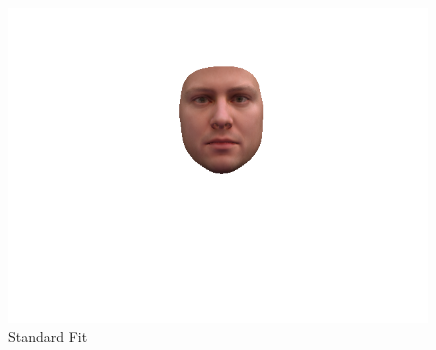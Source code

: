 \begin{figure}[h]
\begin{minipage}{.325\textwidth}
    \end{minipage}
    \begin{minipage}{.325\textwidth}
      \centering
      \caption*{Standard Fit}
      \includegraphics[width=0.99\textwidth]{Figures/dataset/2D/1.png}
    \end{minipage}


\end{figure}
